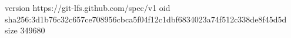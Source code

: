 version https://git-lfs.github.com/spec/v1
oid sha256:3d1b76c32c657ce708956cbca5f04f12c1dbf6834023a74f512c338de8f45d5d
size 349680
